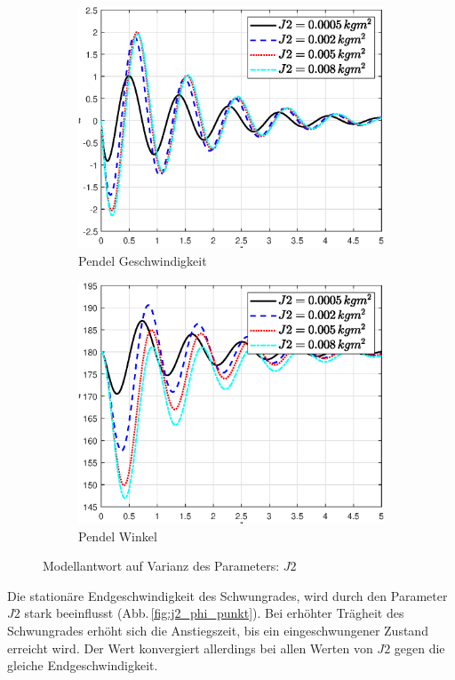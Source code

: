 \begin{figure}
    \begin{subfigure}[b]{0.49\linewidth}
        \includegraphics[width=\linewidth]{Bilder/5_sensi/fig/j2/theta_punkt.eps}
        \caption{Pendel Geschwindigkeit}
        \label{fig:j2_theta_punkt}      
    \end{subfigure}
    \begin{subfigure}[b]{0.49\linewidth}
        \includegraphics[width=\linewidth]{Bilder/5_sensi/fig/j2/theta.eps}
        \caption{Pendel Winkel}
        \label{fig:j2_theta}
    \end{subfigure}
        \caption{Modellantwort auf Varianz des Parameters: $J2$}
        \label{fig:j2}
\end{figure}
Die stationäre Endgeschwindigkeit des Schwungrades, wird durch den Parameter $J2$ stark beeinflusst (Abb.\,\ref{fig:j2_phi_punkt}). 
Bei erhöhter Trägheit des Schwungrades erhöht sich die Anstiegszeit, bis ein eingeschwungener Zustand erreicht wird.
Der Wert konvergiert allerdings bei allen Werten von $J2$ gegen die gleiche Endgeschwindigkeit.\\

